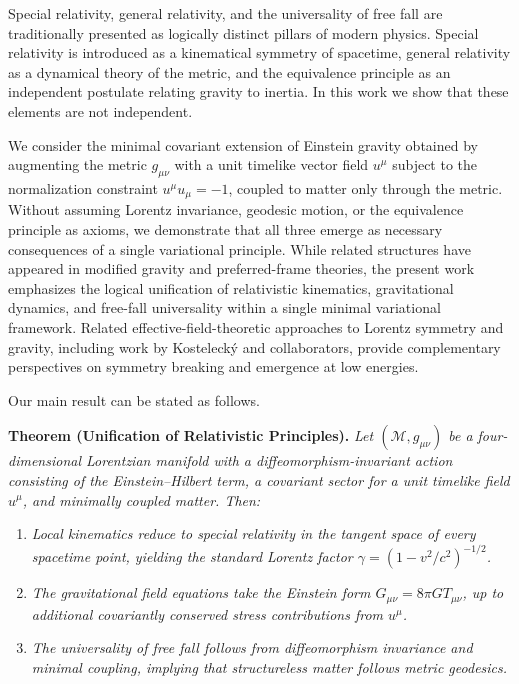 \documentclass[11pt]{article}
\begin{document}
        Special relativity, general relativity, and the universality of free fall are
        traditionally presented as logically distinct pillars of modern physics.
        Special relativity is introduced as a kinematical symmetry of spacetime,
        general relativity as a dynamical theory of the metric, and the equivalence
        principle as an independent postulate relating gravity to inertia.
        In this work we show that these elements are not independent.

        We consider the minimal covariant extension of Einstein gravity obtained by
        augmenting the metric $g_{\mu\nu}$ with a unit timelike vector field $u^\mu$
        subject to the normalization constraint $u^\mu u_\mu=-1$, coupled to matter
        only through the metric.
        Without assuming Lorentz invariance, geodesic motion, or the equivalence
        principle as axioms, we demonstrate that all three emerge as necessary
        consequences of a single variational principle.
        While related structures have appeared in modified gravity and preferred-frame
        theories, the present work emphasizes the logical unification of relativistic
        kinematics, gravitational dynamics, and free-fall universality within a single
        minimal variational framework.
        Related effective-field-theoretic approaches to Lorentz symmetry and gravity,
        including work by Kosteleck\'y and collaborators, provide complementary
        perspectives on symmetry breaking and emergence at low energies.

        Our main result can be stated as follows.

        \medskip
        \noindent\textbf{Theorem (Unification of Relativistic Principles).}
        \emph{Let $(\mathcal{M},g_{\mu\nu})$ be a four-dimensional Lorentzian manifold
        with a diffeomorphism-invariant action consisting of the Einstein--Hilbert
        term, a covariant sector for a unit timelike field $u^\mu$, and minimally
        coupled matter.
        Then:}
        \begin{enumerate}
            \item \emph{Local kinematics reduce to special relativity in the tangent space
            of every spacetime point, yielding the standard Lorentz factor
                $\gamma=(1-v^2/c^2)^{-1/2}$.}
            \item \emph{The gravitational field equations take the Einstein form
                $G_{\mu\nu}=8\pi G T_{\mu\nu}$, up to additional covariantly conserved stress
                contributions from $u^\mu$.}
            \item \emph{The universality of free fall follows from diffeomorphism
            invariance and minimal coupling, implying that structureless matter follows
            metric geodesics.}
        \end{enumerate}
\end{document}
